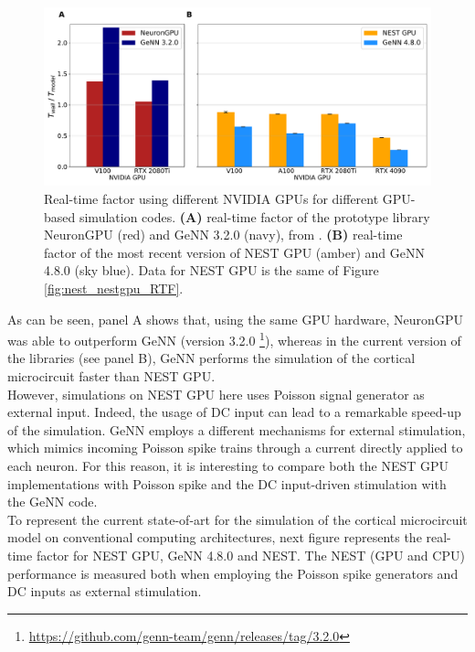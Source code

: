 \documentclass[a4paper, 12pt, twoside, openright]{book}
\begin{document}
\begin{figure}[H]
    \centering
    \includegraphics[width=\columnwidth]{figures/cm_RTF_old_new.pdf}
    \caption{Real-time factor using different NVIDIA GPUs for different GPU-based simulation codes. \textbf{(A)} real-time factor of the prototype library NeuronGPU (red) and GeNN 3.2.0 (navy), from \cite{Golosio2021}. \textbf{(B)} real-time factor of the most recent version of NEST GPU (amber) and GeNN 4.8.0 (sky blue). Data for NEST GPU is the same of Figure \ref{fig:nest_nestgpu_RTF}.}
    \label{fig:cm_rtf_old_new}
\end{figure}

As can be seen, panel A shows that, using the same GPU hardware, NeuronGPU was able to outperform GeNN (version 3.2.0 \footnote{\url{https://github.com/genn-team/genn/releases/tag/3.2.0}}), whereas in the current version of the libraries (see panel B), GeNN performs the simulation of the cortical microcircuit faster than NEST GPU.\\
However, simulations on NEST GPU here uses Poisson signal generator as external input. Indeed, the usage of DC input can lead to a remarkable speed-up of the simulation. GeNN employs a different mechanisms for external stimulation, which mimics incoming Poisson spike trains through a current directly applied to each neuron. For this reason, it is interesting to compare both the NEST GPU implementations with Poisson spike and the DC input-driven stimulation with the GeNN code.\\
To represent the current state-of-art for the simulation of the cortical microcircuit model on conventional computing architectures, next figure represents the real-time factor for NEST GPU, GeNN 4.8.0 and NEST. The NEST (GPU and CPU) performance is measured both when employing the Poisson spike generators and DC inputs as external stimulation.
\end{document}
